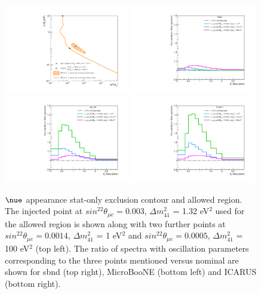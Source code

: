 \begin{figure}[h!]
    \centering
    \includegraphics[width = 0.49\textwidth]{figures-chap6/overlays/nue_app_stat_osc_markers.pdf}
    \includegraphics[width = 0.49\textwidth]{figures-chap6/spectra/nue_app_spectra_ratio_sbnd.pdf}
    \includegraphics[width = 0.49\textwidth]{figures-chap6/spectra/nue_app_spectra_ratio_uboone.pdf}
    \includegraphics[width = 0.49\textwidth]{figures-chap6/spectra/nue_app_spectra_ratio_icarus.pdf}
    \caption[Ratio of \nue appearance spectra with the oscillation parameters shown on the statistical only contour.]{$\nue$ appearance stat-only exclusion contour and allowed region. The injected point at $sin^22\theta_{\mu e} = 0.003$, $\Delta m^2_{41}$ = 1.32 eV$^2$ used for the allowed region is shown along with two further points at $sin^22\theta_{\mu e} = 0.0014$, $\Delta m^2_{41}$ = 1 eV$^2$ and   $sin^22\theta_{\mu e} = 0.0005$, $\Delta m^2_{41}$ = 100 eV$^2$ (top left). The ratio of spectra with oscillation parameters corresponding to the three points mentioned versus nominal are shown for sbnd (top right), MicroBooNE (bottom left) and ICARUS (bottom right).}
    \label{fig:Nue_app_spectra_ratios}
\end{figure}


